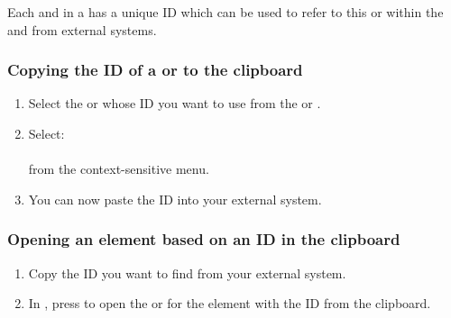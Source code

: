 Each \gdcase{} and \gdsuite{} in a \gdproject{} has a unique ID which can be used to refer to this \gdcase{} or \gdsuite{}  within the \gdproject{} and from external systems.

\subsubsection{Copying the ID of a \gdcase{} or \gdsuite{} to the clipboard}

\begin{enumerate}
\item Select the \gdcase{} or \gdsuite{} whose ID you want to use from the \gdtestcasebrowser{} or \gdtestsuitebrowser{}.
\item Select:\\
\\
from the context-sensitive menu.
\item You can now paste the ID into your external system.
\end{enumerate}


\subsubsection{Opening an element based on an ID in the clipboard}
\begin{enumerate}
\item Copy the ID you want to find from your external system.
\item In \app{}, press  to open the \gdtestcaseeditor{} or \gdtestsuiteeditor{}  for the element with the ID from the clipboard.
\end{enumerate}
